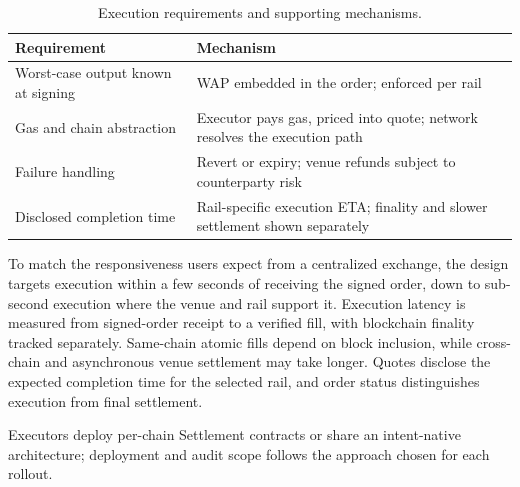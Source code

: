 \begin{table}[ht]
\centering\small
\caption{Execution requirements and supporting mechanisms.}
\label{tab:guarantees}
\begin{tabular}{@{}p{}p{}@{}}
\toprule
\textbf{Requirement} & \textbf{Mechanism} \\
\midrule
Worst-case output known at signing & WAP embedded in the order; enforced per rail \\
Gas and chain abstraction & Executor pays gas, priced into quote; network resolves the execution path \\
Failure handling & Revert or expiry; venue refunds subject to counterparty risk \\
Disclosed completion time & Rail-specific execution ETA; finality and slower settlement shown separately \\
\bottomrule
\end{tabular}
\end{table}

To match the responsiveness users expect from a centralized exchange, the design targets execution within a few seconds of receiving the signed order, down to sub-second execution where the venue and rail support it. Execution latency is measured from signed-order receipt to a verified fill, with blockchain finality tracked separately. Same-chain atomic fills depend on block inclusion, while cross-chain and asynchronous venue settlement may take longer. Quotes disclose the expected completion time for the selected rail, and order status distinguishes execution from final settlement.

Executors deploy per-chain Settlement contracts or share an intent-native architecture; deployment and audit scope follows the approach chosen for each rollout.
